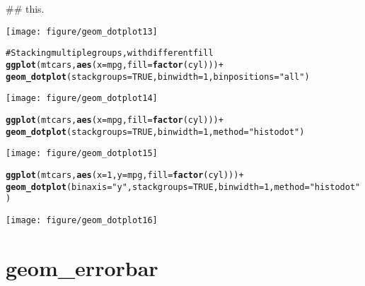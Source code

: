 \documentclass[a4paper,titlepage]{tufte-handout}\usepackage{graphicx, color}
\makeatletter
\def\maxwidth{ %
  \ifdim\Gin@nat@width>\linewidth
    \linewidth
  \else
    \Gin@nat@width
  \fi
}
\newcommand{\hlfunctioncall}[1]{\textcolor[rgb]{0.501960784313725,0,0.329411764705882}{\textbf{#1}}}%
\newcommand{\hlstring}[1]{\textcolor[rgb]{0.6,0.6,1}{#1}}%
\newcommand{\hlcomment}[1]{\textcolor[rgb]{0.180392156862745,0.6,0.341176470588235}{#1}}%
\newenvironment{kframe}{%
 \def\at@end@of@kframe{}%
 \ifinner\ifhmode%
  \def\at@end@of@kframe{\end{minipage}}%
  \begin{minipage}{\columnwidth}%
 \fi\fi%
 \def\FrameCommand##1{\hskip\@totalleftmargin \hskip-\fboxsep
 \colorbox{shadecolor}{##1}\hskip-\fboxsep
     \hskip-\linewidth \hskip-\@totalleftmargin \hskip\columnwidth}%
 \MakeFramed {\advance\hsize-\width
   \@totalleftmargin\z@ \linewidth\hsize
   \@setminipage}}%
 {\par\unskip\endMakeFramed%
 \at@end@of@kframe}
\newenvironment{knitrout}{}{} %
\makeatother
\begin{document}
\begin{knitrout}
\begin{kframe}
\begin{flushleft}
{\#\# this.}\end{flushleft}\end{kframe}\texttt{[image: figure/geom\_dotplot13]} \begin{kframe}\begin{alltt}
\hlcomment{# Stacking multiple groups, with different fill}
\hlfunctioncall{ggplot}(mtcars, \hlfunctioncall{aes}(x = mpg, fill = \hlfunctioncall{factor}(cyl))) +
  \hlfunctioncall{geom_dotplot}(stackgroups = TRUE, binwidth = 1, binpositions = \hlstring{"all"})
\end{alltt}
\end{kframe}\texttt{[image: figure/geom\_dotplot14]} \begin{kframe}\begin{alltt}
\hlfunctioncall{ggplot}(mtcars, \hlfunctioncall{aes}(x = mpg, fill = \hlfunctioncall{factor}(cyl))) +
  \hlfunctioncall{geom_dotplot}(stackgroups = TRUE, binwidth = 1, method = \hlstring{"histodot"})
\end{alltt}
\end{kframe}\texttt{[image: figure/geom\_dotplot15]} \begin{kframe}\begin{alltt}
\hlfunctioncall{ggplot}(mtcars, \hlfunctioncall{aes}(x = 1, y = mpg, fill = \hlfunctioncall{factor}(cyl))) +
  \hlfunctioncall{geom_dotplot}(binaxis = \hlstring{"y"}, stackgroups = TRUE, binwidth = 1, method = \hlstring{"histodot"})
\end{alltt}
\end{kframe}\texttt{[image: figure/geom\_dotplot16]} 
\end{knitrout}


\section{geom\_errorbar}
\end{document}
